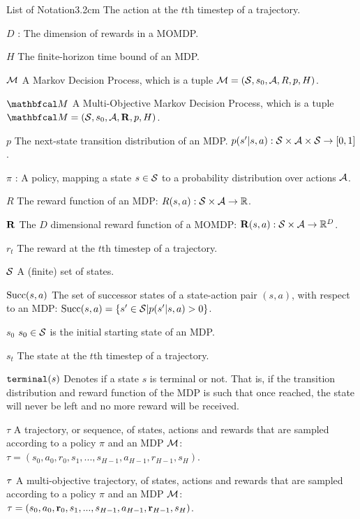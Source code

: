 \begin{mclistof}{List of Notation}{3.2cm}
        The action at the $t$th timestep of a trajectory.
    \item[$D$]:
        The dimension of rewards in a MOMDP.
    \item[$H$]
        The finite-horizon time bound of an MDP.
    \item[$\mathcal{M}$]
        A Markov Decision Process, which is a tuple $\mathcal{M}=(\mathcal{S},s_0,\mathcal{A},R,p,H)$.
    \item[$\bfcl{M}$] 
        A Multi-Objective Markov Decision Process, which is a tuple $\bfcl{M}=(\cl{S},s_0,\cl{A},\bff{R},p,H)$.
    \item[$p$] 
        The next-state transition distribution of an MDP.  $p(s' | s,a) : \mathcal{S} \times \mathcal{A} \times \mathcal{S} \rightarrow [0,1]$.
    \item[$\pi$]:
        A policy, mapping a state $s\in\mathcal{S}$ to a probability distribution over actions $\mathcal{A}$.
    \item[$R$] 
        The reward function of an MDP: $R(s,a) : \mathcal{S}\times \mathcal{A}\rightarrow \mathbb{R}$.
    \item[$\mathbf{R}$] 
        The $D$ dimensional reward function of a MOMDP: $\mathbf{R}(s,a) : \mathcal{S}\times \mathcal{A}\rightarrow \mathbb{R}^D$.
    \item[$r_t$]
        The reward at the $t$th timestep of a trajectory.
    \item[$\mathcal{S}$]
        A (finite) set of states.
    \item[${\textnormal{Succ}(s,a)}$]
        The set of successor states of a state-action pair $(s,a)$, with respect to an MDP: ${\textnormal{Succ}(s,a)}=\{s'\in\mathcal{S}|p(s'|s,a)>0\}$.
    \item[$s_0$]
        $s_0\in\mathcal{S}$ is the initial starting state of an MDP.
    \item[$s_t$]
        The state at the $t$th timestep of a trajectory.
    \item[${\textnormal{\texttt{terminal}}}(s)$]
        Denotes if a state $s$ is terminal or not. That is, if the transition distribution and reward function of the MDP is such that once reached, the state will never be left and no more reward will be received.
    \item[$\tau$]
        A trajectory, or sequence, of states, actions and rewards that are sampled according to a policy $\pi$ and an MDP $\mathcal{M}$: $\tau = (s_0, a_0, r_0, s_1, ..., s_{H-1}, a_{H-1}, r_{H-1}, s_H)$.
    \item[$\mathbf{\tau}$]
        A multi-objective trajectory, of states, actions and rewards that are sampled according to a policy $\pi$ and an MDP $\mathcal{M}$: $\mathbf{\tau} = (s_0, a_0, \mathbf{r}_0, s_1, ..., s_{H-1}, a_{H-1}, \mathbf{r}_{H-1}, s_H)$.

\end{mclistof}
